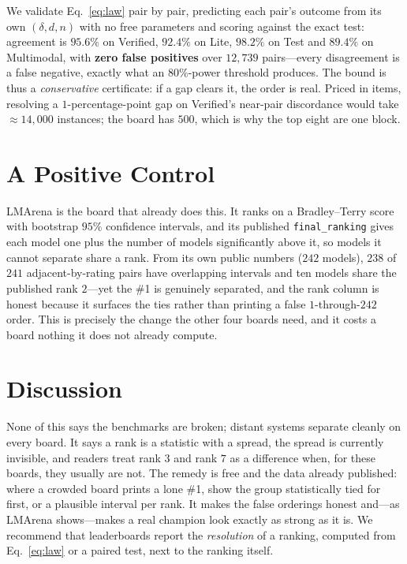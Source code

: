 \documentclass[11pt]{article}
\begin{document}
We validate Eq.~\eqref{eq:law} pair by pair, predicting each pair's outcome from its own $(\delta,d,n)$
with no free parameters and scoring against the exact test: agreement is $95.6\%$ on Verified,
$92.4\%$ on Lite, $98.2\%$ on Test and $89.4\%$ on Multimodal, with \textbf{zero false positives} over $12{,}739$ pairs---every
disagreement is a false negative, exactly what an $80\%$-power threshold produces. The bound is thus a
\emph{conservative} certificate: if a gap clears it, the order is real. Priced in items, resolving a
$1$-percentage-point gap on Verified's near-pair discordance would take $\approx 14{,}000$ instances;
the board has $500$, which is why the top eight are one block.

\section{A Positive Control}
\label{sec:lmarena}
LMArena is the board that already does this. It ranks on a Bradley--Terry score with bootstrap $95\%$
confidence intervals, and its published \texttt{final\_ranking} gives each model one plus the number
of models significantly above it, so models it cannot separate share a rank. From its own public
numbers ($242$ models), $238$ of $241$ adjacent-by-rating pairs have overlapping intervals and ten
models share the published rank $2$---yet the \#1 is genuinely
separated, and the rank column is honest because it surfaces the ties rather than printing a false
$1$-through-$242$ order. This is precisely the change the other four boards need, and it costs a board
nothing it does not already compute.

\section{Discussion}
None of this says the benchmarks are broken; distant systems separate cleanly on every board. It says
a rank is a statistic with a spread, the spread is currently invisible, and readers treat rank $3$ and
rank $7$ as a difference when, for these boards, they usually are not. The remedy is free and the data
already published: where a crowded board prints a lone \#1, show the group statistically tied for
first, or a plausible interval per rank. It makes the false orderings honest and---as LMArena
shows---makes a real champion look exactly as strong as it is. We recommend that leaderboards report
the \emph{resolution} of a ranking, computed from Eq.~\eqref{eq:law} or a paired test, next to the
ranking itself.
\end{document}
